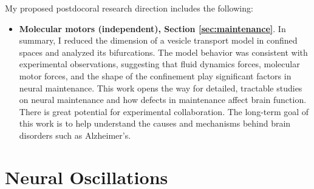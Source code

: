 \documentclass[a4paper,11pt]{article}
\begin{document}
My proposed postdocoral research direction includes the following:
\begin{itemize}
	\item \textbf{Molecular motors (independent), Section \ref{sec:maintenance}}. In summary, I reduced the dimension of a vesicle transport model in confined spaces and analyzed its bifurcations. The model behavior was consistent with experimental observations, suggesting that fluid dynamics forces, molecular motor forces, and the shape of the confinement play significant factors in neural maintenance. This work opens the way for detailed, tractable studies on neural maintenance and how defects in maintenance affect brain function. There is great potential for experimental collaboration. The long-term goal of this work is to help understand the causes and mechanisms behind  brain disorders such as Alzheimer's.
\end{itemize}



\section{Neural Oscillations}\label{sec:interactions}



\end{document}
